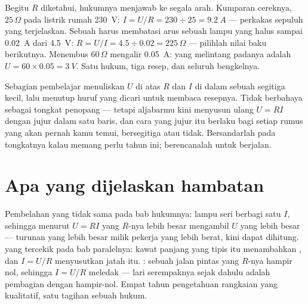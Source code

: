 \begin{example}\label{ex:g8:ohms-law:compute}
Begitu $R$ diketahui, hukumnya menjawab ke segala arah. Kumparan
cereknya, $25\,\Omega$ pada listrik rumah \qty{230}{V}:
$I = U/R = 230 \div 25 = \qty{9.2}{A}$ --- perkakas sepuluh 
yang terjelaskan. Sebuah  harus membatasi arus sebuah lampu
yang halus sampai \qty{0.02}{A} dari \qty{4.5}{V}: $R = U/I = 4.5
\div 0.02 = 225\,\Omega$ --- pilihlah nilai baku berikutnya. Menembus
$60\,\Omega$ mengalir \qty{0.05}{A}:  yang melintang padanya
adalah $U = 60 \times 0.05 = \qty{3}{V}$. Satu hukum, tiga resep, dan
seluruh bengkelnya.
\end{example}

\begin{remark}\label{rem:g8:ohms-law:triangle}
Sebagian pembelajar menuliskan $U$ di atas $R$ dan $I$ di dalam sebuah
segitiga kecil, lalu menutup huruf yang dicari untuk membaca resepnya.
Tidak berbahaya sebagai tongkat penopang --- tetapi aljabarmu kini
menyusun ulang $U = R I$ dengan jujur dalam satu baris, dan cara yang
jujur itu berlaku bagi setiap rumus yang akan pernah kamu temui,
bersegitiga atau tidak. Bersandarlah pada tongkatnya kalau memang
perlu tahun ini; berencanalah untuk berjalan.
\end{remark}

\section{Apa yang dijelaskan hambatan}

\begin{example}\label{ex:g8:ohms-law:mysteries}
Pembelahan  yang tidak sama pada bab hukumnya: lampu seri
berbagi satu $I$, sehingga menurut $U = R I$ yang $R$-nya lebih besar
mengambil $U$ yang lebih besar --- turunan yang lebih besar milik
pekerja yang lebih berat, kini dapat dihitung.  yang tercekik
pada bab paralelnya: kawat panjang yang tipis itu menambahkan
, dan $I = U/R$ menyusutkan jatah  itu. :
sebuah jalan pintas yang $R$-nya hampir nol, sehingga $I = U/R$
meledak --- lari serempaknya sejak dahulu adalah pembagian dengan
hampir-nol. Empat tahun pengetahuan rangkaian yang kualitatif, satu
tagihan sebuah hukum.
\end{example}

